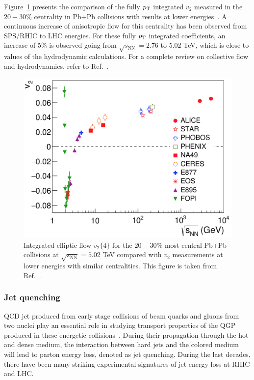Figure~\ref{fig:intro_v2_ALICE} presents the comparison of the fully $p_\text{T}$ integrated $v_2$ measured in the $20-30\%$ centrality in Pb+Pb collisions with results at lower energies~\cite{Adam:2016izf}. A continuous increase of anisotropic flow for this centrality has been observed from SPS/RHIC to LHC energies. For these fully $p_\text{T}$ integrated coefficients, an increase of $5\%$ is observed going from $\sqrt{s_\text{NN}}=2.76$ to 5.02 TeV, which is close to values of the hydrodynamic calculations. For a complete review on collective flow and hydrodynamics, refer to Ref.~\cite{Heinz:2013th, Jeon:2015dfa}.

\begin{figure}[H]
\centering
\includegraphics[width=.6\linewidth]{figs/chapter_intro/v2_ALICE.png}
\caption{Integrated elliptic flow $v_2\{4\}$ for the $20-30\%$ most central Pb+Pb collisions at $\sqrt{s_\text{NN}}=5.02$ TeV compared with $v_2$ measurements at lower energies with similar centralities. This figure is taken from Ref.~\cite{Adam:2016izf}.}
\label{fig:intro_v2_ALICE}
\end{figure}



\subsubsection{Jet quenching}

QCD jet produced from early stage collisions of beam quarks and gluons from two nuclei play an essential role in studying transport properties of the QGP produced in these energetic collisions~\cite{Qin:2015srf}. During their propagation through the hot and dense medium, the interaction between hard jets and the colored medium will lead to parton energy loss, denoted as jet quenching. During the last decades, there have been many striking experimental signatures of jet energy loss at RHIC and LHC. 

